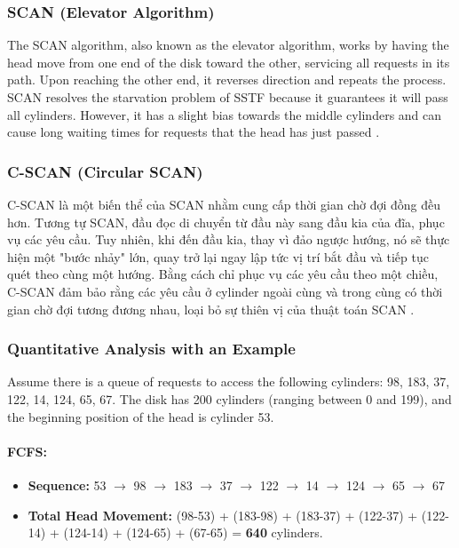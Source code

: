 \documentclass[12pt]{article}
\begin{document}
\subsubsection{SCAN (Elevator Algorithm)}
The SCAN algorithm, also known as the elevator algorithm, works by having the head move from one end of the disk toward the other, servicing all requests in its path. Upon reaching the other end, it reverses direction and repeats the process. SCAN resolves the starvation problem of SSTF because it guarantees it will pass all cylinders. However, it has a slight bias towards the middle cylinders and can cause long waiting times for requests that the head has just passed \parencite{GeeksForGeeks2025IO}.

\subsubsection{C-SCAN (Circular SCAN)}
C-SCAN là một biến thể của SCAN nhằm cung cấp thời gian chờ đợi đồng đều hơn. Tương tự SCAN, đầu đọc di chuyển từ đầu này sang đầu kia của đĩa, phục vụ các yêu cầu. Tuy nhiên, khi đến đầu kia, thay vì đảo ngược hướng, nó sẽ thực hiện một "bước nhảy" lớn, quay trở lại ngay lập tức vị trí bắt đầu và tiếp tục quét theo cùng một hướng. Bằng cách chỉ phục vụ các yêu cầu theo một chiều, C-SCAN đảm bảo rằng các yêu cầu ở cylinder ngoài cùng và trong cùng có thời gian chờ đợi tương đương nhau, loại bỏ sự thiên vị của thuật toán SCAN \parencite{KansalDiskScheduling, GeeksForGeeks2025IO}.

\subsubsection{Quantitative Analysis with an Example}
Assume there is a queue of requests to access the following cylinders: 98, 183, 37, 122, 14, 124, 65, 67. The disk has 200 cylinders (ranging between 0 and 199), and the beginning position of the head is cylinder 53.

\paragraph{FCFS:}
\begin{itemize}
    \item \textbf{Sequence:} 53 \(\rightarrow\) 98 \(\rightarrow\) 183 \(\rightarrow\) 37 \(\rightarrow\) 122 \(\rightarrow\) 14 \(\rightarrow\) 124 \(\rightarrow\) 65 \(\rightarrow\) 67
    \item \textbf{Total Head Movement:} (98-53) + (183-98) + (183-37) + (122-37) + (122-14) + (124-14) + (124-65) + (67-65) = \textbf{640} cylinders.
\end{itemize}
\end{document}
